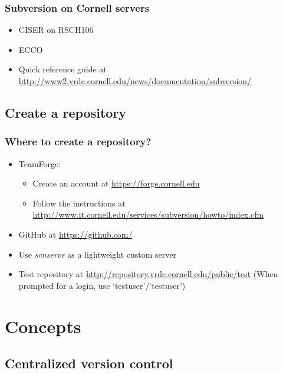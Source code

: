 \documentclass{beamer}
\begin{document}
\frame
{
  \frametitle{Subversion on Cornell servers}
  
  \begin{itemize}
  \item<1-> CISER on RSCH106
  \item<2-> ECCO
  \item<3-> Quick reference guide at \url{http://www2.vrdc.cornell.edu/news/documentation/subversion/}
  \end{itemize}

}

\subsection{Create a repository}

{
  \frametitle{Where to create a repository?}
  
  \begin{itemize}
  \item<1-> TeamForge:
  	\begin{itemize}
	\item<1-> Create an account at \url{https://forge.cornell.edu}
	\item<1-> Follow the instructions at \url{http://www.it.cornell.edu/services/subversion/howto/index.cfm}
	\end{itemize}
  \item<2-> GitHub at \url{https://github.com/}
  \item<3-> Use \textit{svnserve} as a lightweight custom server
  \item<4-> Test repository at \url{http://repository.vrdc.cornell.edu/public/test} (When prompted for a login, use `testuser'/`testuser')
  \end{itemize}

}


\section{Concepts}

\subsection{Centralized version control}
\end{document}
